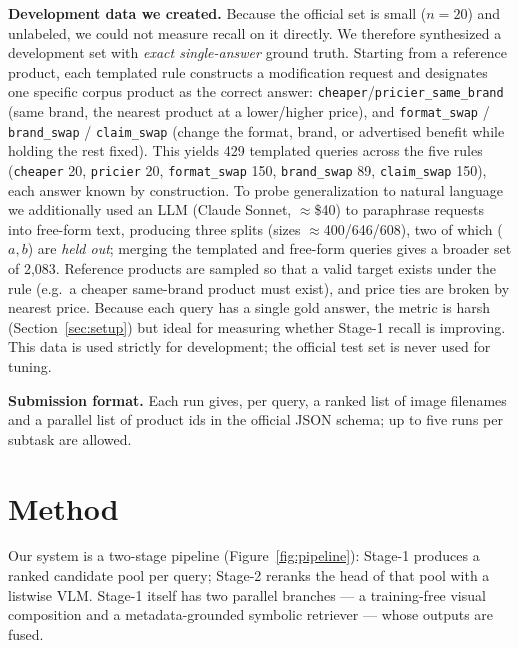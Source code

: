 \documentclass[sigconf,nonacm]{acmart}
\begin{document}
\textbf{Development data we created.} Because the official set is small
($n{=}20$) and unlabeled, we could not measure recall on it directly. We
therefore synthesized a development set with \emph{exact single-answer}
ground truth. Starting from a reference product, each templated rule
constructs a modification request and designates one specific corpus product
as the correct answer: \texttt{cheaper}/\texttt{pricier\_same\_brand} (same
brand, the nearest product at a lower/higher price), and
\texttt{format\_swap} / \texttt{brand\_swap} / \texttt{claim\_swap} (change
the format, brand, or advertised benefit while holding the rest fixed). This
yields 429 templated queries across the five rules (\texttt{cheaper} 20,
\texttt{pricier} 20, \texttt{format\_swap} 150, \texttt{brand\_swap} 89,
\texttt{claim\_swap} 150), each answer known by construction. To probe generalization to natural language we additionally
used an LLM (Claude Sonnet, $\approx$\$40) to paraphrase requests into
free-form text, producing three splits (sizes $\approx$400/646/608), two of
which ($a,b$) are \emph{held out}; merging the templated and free-form
queries gives a broader set of 2{,}083. Reference products are sampled so
that a valid target exists under the rule (e.g.\ a cheaper same-brand product
must exist), and price ties are broken by nearest price. Because each query
has a single gold answer, the metric is
harsh (Section~\ref{sec:setup}) but ideal for measuring whether Stage-1
recall is improving. This data is used strictly for development; the
official test set is never used for tuning.

\textbf{Submission format.} Each run gives, per query, a ranked list of image
filenames and a parallel list of product ids in the official JSON schema; up to
five runs per subtask are allowed.

\section{Method}
Our system is a two-stage pipeline (Figure~\ref{fig:pipeline}): Stage-1
produces a ranked candidate pool per query; Stage-2 reranks the head of that
pool with a listwise VLM. Stage-1 itself has two parallel branches --- a
training-free visual composition and a metadata-grounded symbolic retriever
--- whose outputs are fused.
\end{document}
